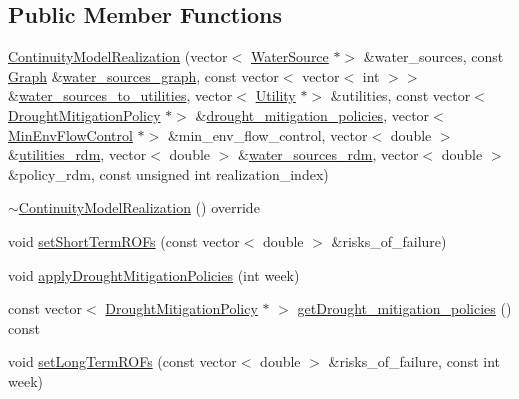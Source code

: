 \subsection*{Public Member Functions}
\begin{DoxyCompactItemize}
\item 
\mbox{\hyperlink{classContinuityModelRealization_a641c096ac73586597b3e21a5d516c923_a641c096ac73586597b3e21a5d516c923}{Continuity\+Model\+Realization}} (vector$<$ \mbox{\hyperlink{classWaterSource}{Water\+Source}} $\ast$$>$ \&water\+\_\+sources, const \mbox{\hyperlink{classGraph}{Graph}} \&\mbox{\hyperlink{classContinuityModel_a563401588c6fa622f03393909a3522db_a563401588c6fa622f03393909a3522db}{water\+\_\+sources\+\_\+graph}}, const vector$<$ vector$<$ int $>$$>$ \&\mbox{\hyperlink{classContinuityModel_ae8516bcbbf52650190277fc8b06c1843_ae8516bcbbf52650190277fc8b06c1843}{water\+\_\+sources\+\_\+to\+\_\+utilities}}, vector$<$ \mbox{\hyperlink{classUtility}{Utility}} $\ast$$>$ \&utilities, const vector$<$ \mbox{\hyperlink{classDroughtMitigationPolicy}{Drought\+Mitigation\+Policy}} $\ast$$>$ \&\mbox{\hyperlink{classContinuityModelRealization_a757dcf1de115c674fd5adcb040c5f277_a757dcf1de115c674fd5adcb040c5f277}{drought\+\_\+mitigation\+\_\+policies}}, vector$<$ \mbox{\hyperlink{classMinEnvFlowControl}{Min\+Env\+Flow\+Control}} $\ast$$>$ \&min\+\_\+env\+\_\+flow\+\_\+control, vector$<$ double $>$ \&\mbox{\hyperlink{classContinuityModel_aa4a00b76da6295d2faa11e3dcaea1896_aa4a00b76da6295d2faa11e3dcaea1896}{utilities\+\_\+rdm}}, vector$<$ double $>$ \&\mbox{\hyperlink{classContinuityModel_ab7b8fa93a6f56b328e425e1ead6cfefa_ab7b8fa93a6f56b328e425e1ead6cfefa}{water\+\_\+sources\+\_\+rdm}}, vector$<$ double $>$ \&policy\+\_\+rdm, const unsigned int realization\+\_\+index)
\item 
\mbox{\hyperlink{classContinuityModelRealization_afd53069e2f9ab96210ff153d16f01269_afd53069e2f9ab96210ff153d16f01269}{$\sim$\+Continuity\+Model\+Realization}} () override
\item 
void \mbox{\hyperlink{classContinuityModelRealization_a2db1784f020ed147335894022e20e457_a2db1784f020ed147335894022e20e457}{set\+Short\+Term\+R\+O\+Fs}} (const vector$<$ double $>$ \&risks\+\_\+of\+\_\+failure)
\item 
void \mbox{\hyperlink{classContinuityModelRealization_a1841f4ca49c150cf5d790f6d42496575_a1841f4ca49c150cf5d790f6d42496575}{apply\+Drought\+Mitigation\+Policies}} (int week)
\item 
const vector$<$ \mbox{\hyperlink{classDroughtMitigationPolicy}{Drought\+Mitigation\+Policy}} $\ast$ $>$ \mbox{\hyperlink{classContinuityModelRealization_acdbf441e416f406afe47afb7f35c11c8_acdbf441e416f406afe47afb7f35c11c8}{get\+Drought\+\_\+mitigation\+\_\+policies}} () const
\item 
void \mbox{\hyperlink{classContinuityModelRealization_a45cde9269efee4dc94f4905769983c9f_a45cde9269efee4dc94f4905769983c9f}{set\+Long\+Term\+R\+O\+Fs}} (const vector$<$ double $>$ \&risks\+\_\+of\+\_\+failure, const int week)
\end{DoxyCompactItemize}
